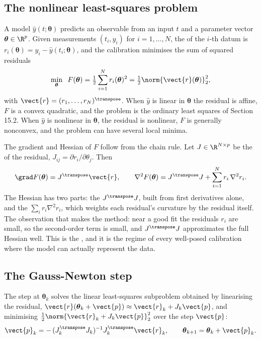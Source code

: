 \subsection{The nonlinear least-squares problem}

A model $\hat{y}(t; \boldsymbol{\theta})$ predicts an observable from an
input $t$ and a parameter vector $\boldsymbol{\theta} \in \R^{p}$.
Given measurements $(t_{i}, y_{i})$ for $i = 1, \ldots, N$, the
 of the $i$-th datum is $r_{i}(\boldsymbol{\theta}) =
y_{i} - \hat{y}(t_{i}; \boldsymbol{\theta})$, and the calibration
minimises the sum of squared residuals
\[
\min_{\boldsymbol{\theta}} \;\; F(\boldsymbol{\theta}) =
\tfrac{1}{2} \sum_{i=1}^{N} r_{i}(\boldsymbol{\theta})^{2}
= \tfrac{1}{2} \norm{\vect{r}(\boldsymbol{\theta})}_{2}^{2},
\]
with $\vect{r} = (r_{1}, \ldots, r_{N})^{\transpose}$. When
$\hat{y}$ is linear in $\boldsymbol{\theta}$ the residual is affine,
$F$ is a convex quadratic, and the problem is the ordinary least
squares of Section 15.2. When $\hat{y}$ is nonlinear in
$\boldsymbol{\theta}$, the residual is nonlinear, $F$ is generally
nonconvex, and the problem can have several local minima.

The gradient and Hessian of $F$ follow from the chain rule. Let $J \in
\R^{N \times p}$ be the  of the residual,
$J_{ij} = \partial r_{i} / \partial \theta_{j}$. Then
\[
\grad F(\boldsymbol{\theta}) = J^{\transpose} \vect{r},
\qquad
\nabla^{2} F(\boldsymbol{\theta}) = J^{\transpose} J +
\sum_{i=1}^{N} r_{i} \, \nabla^{2} r_{i}.
\]
The Hessian has two parts: the 
$J^{\transpose} J$, built from first derivatives alone, and the
 $\sum_{i} r_{i} \nabla^{2} r_{i}$, which
weights each residual's curvature by the residual itself. The
observation that makes the method: near a good fit the residuals
$r_{i}$ are small, so the second-order term is small, and
$J^{\transpose} J$ approximates the full Hessian well. This is the
, and it is the regime of every
well-posed calibration where the model can actually represent the data.

\subsection{The Gauss-Newton step}

\begin{definition}
The  step at $\boldsymbol{\theta}_{k}$ solves the
linear least-squares subproblem obtained by linearising the residual,
$\vect{r}(\boldsymbol{\theta}_{k} + \vect{p}) \approx \vect{r}_{k} +
J_{k} \vect{p}$, and minimising $\tfrac{1}{2} \norm{\vect{r}_{k} +
J_{k} \vect{p}}_{2}^{2}$ over the step $\vect{p}$:
\[
\vect{p}_{k} = -\,(J_{k}^{\transpose} J_{k})^{-1} J_{k}^{\transpose}
\vect{r}_{k},
\qquad
\boldsymbol{\theta}_{k+1} = \boldsymbol{\theta}_{k} + \vect{p}_{k}.
\]
\end{definition}

